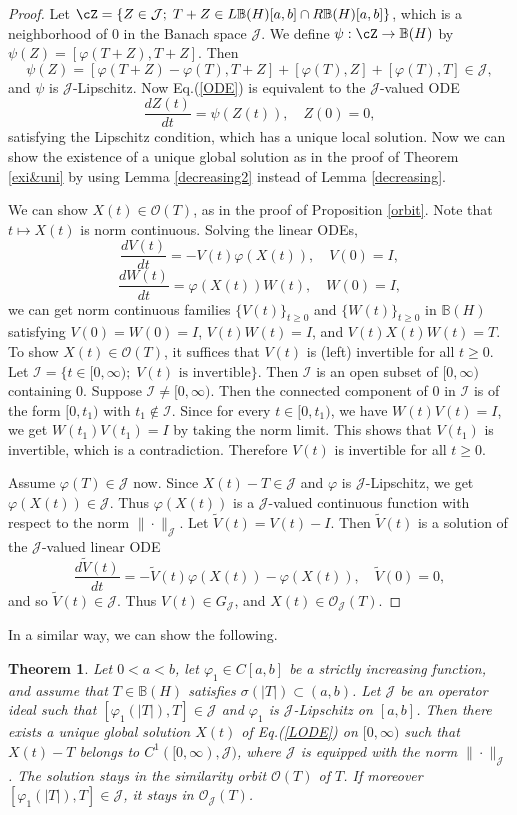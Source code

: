 \documentclass[12pt]{article}
\newtheorem{theorem}{Theorem}[section]
\theoremstyle{definition}
\numberwithin{equation}{section}
\newcommand{\B}{\mathbb{B}}
\newcommand{\cI}{\mathcal{I}} \newcommand{\cJ}{\mathcal{J}}
\newcommand{\cO}{\mathcal{O}} \newcommand{\cP}{\mathcal{P}}
\begin{document}
\begin{proof} Let $\cZ=\{Z\in \cJ;\; T+Z\in L\B(H)[a,b]\cap R\B(H)[a,b] \}$, which is a neighborhood 
of $0$ in the Banach space $\cJ$. 
We define $\psi:\cZ\to \B(H)$ by $\psi(Z)=[\varphi(T+Z),T+Z]$. 
Then
\[\psi(Z)=[\varphi(T+Z)-\varphi(T),T+Z]+[\varphi(T),Z]+[\varphi(T),T]\in \cJ,\]
and $\psi$ is $\cJ$-Lipschitz. 
Now  Eq.(\ref{ODE}) is equivalent to the $\cJ$-valued ODE
\[\frac{dZ(t)}{dt}=\psi(Z(t)),\quad Z(0)=0,\] 
satisfying the Lipschitz condition, which has a unique local solution. 
Now we can show the existence of a unique global solution as in the proof of Theorem \ref{exi&uni} by using 
Lemma \ref{decreasing2} instead of Lemma \ref{decreasing}. 


We can show $X(t)\in \cO(T)$, as in the proof of Proposition \ref{orbit}. 
Note that $t\mapsto X(t)$ is norm continuous. 
Solving the linear ODEs, 
\[\frac{dV(t)}{dt}=-V(t)\varphi(X(t)),\quad V(0)=I,\]
\[\frac{dW(t)}{dt}=\varphi(X(t))W(t),\quad W(0)=I,\]
we can get norm continuous families $\{V(t)\}_{t\geq 0}$ and $\{W(t)\}_{t\geq 0}$ 
in $\B(H)$ satisfying $V(0)=W(0)=I$, $V(t)W(t)=I$, and $V(t)X(t)W(t)=T$. 
To show $X(t)\in \cO(T)$, it suffices that $V(t)$ is (left) invertible for all $t\geq 0$. 
Let $\cI=\{t\in [0,\infty);\; \text{$V(t)$ is invertible}\}$. 
Then $\cI$ is an open subset of $[0,\infty)$ containing $0$. 
Suppose $\cI\neq [0,\infty)$. 
Then the connected component of $0$ in $\cI$ is of the form $[0,t_1)$ with $t_1\notin \cI$. 
Since for every $t\in [0,t_1)$, we have $W(t)V(t)=I$, we get $W(t_1)V(t_1)=I$ by taking the norm limit. 
This shows that $V(t_1)$ is invertible, which is a contradiction. 
Therefore $V(t)$ is invertible for all $t\geq 0$. 

Assume $\varphi(T)\in \cJ$ now. 
Since $X(t)-T\in \cJ$ and $\varphi$ is $\cJ$-Lipschitz, we get $\varphi(X(t))\in \cJ$. 
Thus $\varphi(X(t))$ is a $\cJ$-valued continuous function with respect to the norm $\|\cdot \|_\cJ$. 
Let $\tilde{V}(t)=V(t)-I$. 
Then $\tilde{V}(t)$ is a solution of the $\cJ$-valued linear ODE
\[\frac{d\tilde{V}(t)}{dt}=-\tilde{V}(t)\varphi(X(t))-\varphi(X(t)),\quad \tilde{V}(0)=0,\]
and so $\tilde{V}(t)\in \cJ$. 
Thus $V(t)\in G_\cJ$, and $X(t)\in \cO_\cJ(T)$. 
\end{proof}


In a similar way, we can show the following. 


\begin{theorem}\label{exi&uni3}
Let $0<a<b$, let $\varphi_1\in C[a,b]$ be a strictly increasing function, and  
assume that $T\in \B(H)$ satisfies $\sigma(|T|)\subset (a,b)$. 
Let $\cJ$ be an operator ideal such that $[\varphi_1(|T|),T]\in \cJ$ and $\varphi_1$ is $\cJ$-Lipschitz on $[a,b]$. 
Then there exists a unique global solution $X(t)$ of Eq.(\ref{LODE}) on $[0,\infty)$ such that 
$X(t)-T$ belongs to  $C^1([0,\infty),\cJ)$, where $\cJ$ is equipped with the norm $\|\cdot\|_\cJ$.   	
The solution stays in the similarity orbit $\cO(T)$ of $T$. 
If moreover $[\varphi_1(|T|),T]\in \cJ$, it stays in $\cO_\cJ(T)$. 
\end{theorem}
\end{document}
